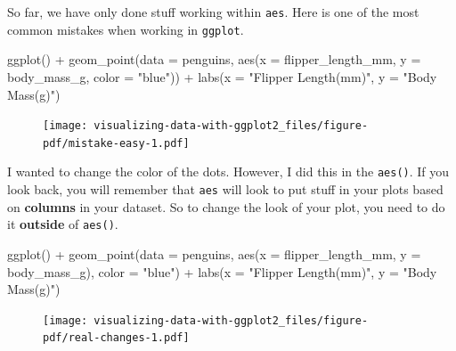\documentclass[
  letterpaper,
  DIV=11,
  numbers=noendperiod,
  oneside]{scrreprt}
\newenvironment{Shaded}{\begin{snugshade}}{\end{snugshade}}
\newcommand{\AttributeTok}[1]{\textcolor[rgb]{0.40,0.45,0.13}{#1}}
\newcommand{\FunctionTok}[1]{\textcolor[rgb]{0.28,0.35,0.67}{#1}}
\newcommand{\NormalTok}[1]{\textcolor[rgb]{0.00,0.23,0.31}{#1}}
\newcommand{\SpecialCharTok}[1]{\textcolor[rgb]{0.37,0.37,0.37}{#1}}
\newcommand{\StringTok}[1]{\textcolor[rgb]{0.13,0.47,0.30}{#1}}
\begin{document}
So far, we have only done stuff working within \texttt{aes}. Here is one
of the most common mistakes when working in \texttt{ggplot}.

\begin{Shaded}
\begin{Highlighting}[]
\FunctionTok{ggplot}\NormalTok{() }\SpecialCharTok{+}
  \FunctionTok{geom\_point}\NormalTok{(}\AttributeTok{data =}\NormalTok{ penguins,}
              \FunctionTok{aes}\NormalTok{(}\AttributeTok{x =}\NormalTok{ flipper\_length\_mm,}
                  \AttributeTok{y =}\NormalTok{ body\_mass\_g,}
                  \AttributeTok{color =} \StringTok{"blue"}\NormalTok{)) }\SpecialCharTok{+}
  \FunctionTok{labs}\NormalTok{(}\AttributeTok{x =} \StringTok{"Flipper Length(mm)"}\NormalTok{, }\AttributeTok{y =} \StringTok{"Body Mass(g)"}\NormalTok{)}
\end{Highlighting}
\end{Shaded}

\begin{figure}[H]

{\centering \texttt{[image: visualizing-data-with-ggplot2\_files/figure-pdf/mistake-easy-1.pdf]}

}

\end{figure}

I wanted to change the color of the dots. However, I did this in the
\texttt{aes()}. If you look back, you will remember that \texttt{aes}
will look to put stuff in your plots based on \textbf{columns} in your
dataset. So to change the look of your plot, you need to do it
\textbf{outside} of \texttt{aes()}.

\begin{Shaded}
\begin{Highlighting}[]
\FunctionTok{ggplot}\NormalTok{() }\SpecialCharTok{+}
  \FunctionTok{geom\_point}\NormalTok{(}\AttributeTok{data =}\NormalTok{ penguins,}
            \FunctionTok{aes}\NormalTok{(}\AttributeTok{x =}\NormalTok{ flipper\_length\_mm,}
           \AttributeTok{y =}\NormalTok{ body\_mass\_g), }\AttributeTok{color =} \StringTok{"blue"}\NormalTok{) }\SpecialCharTok{+}
  \FunctionTok{labs}\NormalTok{(}\AttributeTok{x =} \StringTok{"Flipper Length(mm)"}\NormalTok{, }\AttributeTok{y =} \StringTok{"Body Mass(g)"}\NormalTok{)}
\end{Highlighting}
\end{Shaded}

\begin{figure}[H]

{\centering \texttt{[image: visualizing-data-with-ggplot2\_files/figure-pdf/real-changes-1.pdf]}

}

\end{figure}
\end{document}
